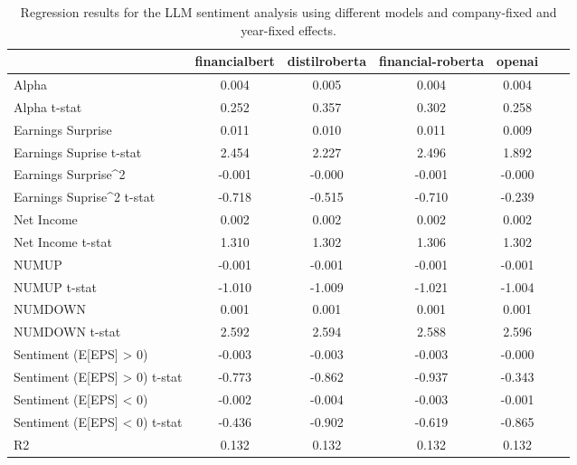 \begin{table}
\caption{Regression results for the LLM sentiment analysis using different models and company-fixed and year-fixed effects.}
\label{tab:llm_regressions_split_cy_fixed}
\begin{tabular}{lcccccc}
\toprule
 & financialbert & distilroberta & financial-roberta & openai \\
\midrule
Alpha & 0.004 & 0.005 & 0.004 & 0.004 \\
Alpha t-stat & 0.252 & 0.357 & 0.302 & 0.258 \\
Earnings Surprise & 0.011 & 0.010 & 0.011 & 0.009 \\
Earnings Suprise t-stat & 2.454 & 2.227 & 2.496 & 1.892 \\
Earnings Surprise^2 & -0.001 & -0.000 & -0.001 & -0.000 \\
Earnings Suprise^2 t-stat & -0.718 & -0.515 & -0.710 & -0.239 \\
Net Income & 0.002 & 0.002 & 0.002 & 0.002 \\
Net Income t-stat & 1.310 & 1.302 & 1.306 & 1.302 \\
NUMUP & -0.001 & -0.001 & -0.001 & -0.001 \\
NUMUP t-stat & -1.010 & -1.009 & -1.021 & -1.004 \\
NUMDOWN & 0.001 & 0.001 & 0.001 & 0.001 \\
NUMDOWN t-stat & 2.592 & 2.594 & 2.588 & 2.596 \\
Sentiment (E[EPS] > 0) & -0.003 & -0.003 & -0.003 & -0.000 \\
Sentiment (E[EPS] > 0) t-stat & -0.773 & -0.862 & -0.937 & -0.343 \\
Sentiment (E[EPS] < 0) & -0.002 & -0.004 & -0.003 & -0.001 \\
Sentiment (E[EPS] < 0) t-stat & -0.436 & -0.902 & -0.619 & -0.865 \\
R2 & 0.132 & 0.132 & 0.132 & 0.132 \\
\bottomrule
\end{tabular}
\end{table}
